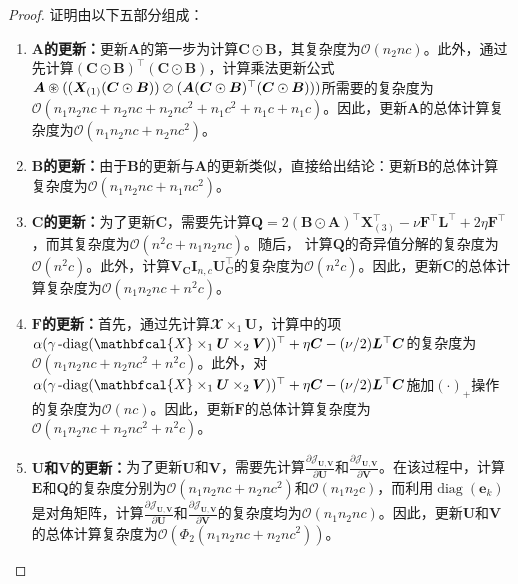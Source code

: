 \begin{proof}
证明由以下五部分组成：
\begin{enumerate}
    \item \textbf{$\boldsymbol{A}$的更新：}更新$\boldsymbol{A}$的第一步为计算$\boldsymbol{C}\odot\boldsymbol{B}$，其复杂度为$\mathcal{O}(n_{2}nc)$。此外，通过先计算$(\boldsymbol{C}\odot\boldsymbol{B})^{\top}(\boldsymbol{C}\odot\boldsymbol{B})$，计算乘法更新公式$\boldsymbol{A}\oast((\boldsymbol{X}_{(1)}(\boldsymbol{C}\odot\boldsymbol{B}))\oslash\allowbreak(\boldsymbol{A}(\boldsymbol{C}\odot\boldsymbol{B})^{\top}(\boldsymbol{C}\odot\boldsymbol{B})))$所需要的复杂度为$\mathcal{O}(n_{1}n_{2}nc+n_{2}nc+n_{2}nc^{2}+n_{1}c^{2}+n_{1}c+n_{1}c)$。因此，更新$\boldsymbol{A}$的总体计算复杂度为$\mathcal{O}(n_{1}n_{2}nc+n_{2}nc^{2})$。
    \item \textbf{$\boldsymbol{B}$的更新：}由于$\boldsymbol{B}$的更新与$\boldsymbol{A}$的更新类似，直接给出结论：更新$\boldsymbol{B}$的总体计算复杂度为$\mathcal{O}(n_{1}n_{2}nc+n_{1}nc^{2})$。
    \item \textbf{$\boldsymbol{C}$的更新：}为了更新$\boldsymbol{C}$，需要先计算$\boldsymbol{Q}=2(\boldsymbol{B}\odot\boldsymbol{A})^{\top}\boldsymbol{X}_{(3)}^{\top}-\nu\boldsymbol{F}^{\top}\boldsymbol{L}^{\top} + 2\eta\boldsymbol{F}^{\top}$，而其复杂度为$\mathcal{O}(n^{2}c+n_{1}n_{2}nc)$。随后，
    计算$\boldsymbol{Q}$的奇异值分解的复杂度为$\mathcal{O}(n^{2}c)$。此外，计算$\boldsymbol{V}_{\boldsymbol{C}}\boldsymbol{I}_{n,c}\boldsymbol{U}_{\boldsymbol{C}}^{\top}$的复杂度为$\mathcal{O}(n^{2}c)$。因此，更新$\boldsymbol{C}$的总体计算复杂度为$\mathcal{O}(n_{1}n_{2}nc+n^{2}c)$。
    \item \textbf{$\boldsymbol{F}$的更新：}首先，通过先计算$\mathbfcal{X}\times_{1}\boldsymbol{U}$，计算中的项$\alpha(\mydiag(\mathbfcal{X}\times_{1}\boldsymbol{U}\times_{2}\boldsymbol{V}))^{\top} +\eta\boldsymbol{C}-(\nu/2)\boldsymbol{L}^{\top}\boldsymbol{C}$的复杂度为$\mathcal{O}(n_{1}n_{2}nc+n_{2}nc^{2}+n^{2}c)$。此外，对$\alpha(\mydiag(\mathbfcal{X}\times_{1}\allowbreak\boldsymbol{U}\times_{2}\boldsymbol{V}))^{\top} +\eta\boldsymbol{C}-(\nu/2)\boldsymbol{L}^{\top}\boldsymbol{C}$施加$(\cdot)_{+}$操作的复杂度为$\mathcal{O}(nc)$。因此，更新$\boldsymbol{F}$的总体计算复杂度为$\mathcal{O}(n_{1}n_{2}nc+n_{2}nc^{2}+n^{2}c)$。
    \item \textbf{$\boldsymbol{U}$和$\boldsymbol{V}$的更新：}为了更新$\boldsymbol{U}$和$\boldsymbol{V}$，需要先计算$\frac{\partial\mathcal{J}_{\boldsymbol{U},\boldsymbol{V}}}{\partial\boldsymbol{U}}$和$\frac{\partial\mathcal{J}_{\boldsymbol{U},\boldsymbol{V}}}{\partial\boldsymbol{V}}$。在该过程中，计算$\boldsymbol{E}$和$\boldsymbol{Q}$的复杂度分别为$\mathcal{O}(n_{1}n_{2}nc+n_{2}nc^{2})$和$\mathcal{O}(n_{1}n_{2}c)$，而利用$\operatorname{diag}(\boldsymbol{e}_{k})$是对角矩阵，计算$\frac{\partial\mathcal{J}_{\boldsymbol{U},\boldsymbol{V}}}{\partial\boldsymbol{U}}$和$\frac{\partial\mathcal{J}_{\boldsymbol{U},\boldsymbol{V}}}{\partial\boldsymbol{V}}$的复杂度均为$\mathcal{O}(n_{1}n_{2}nc)$。因此，更新$\boldsymbol{U}$和$\boldsymbol{V}$的总体计算复杂度为$\mathcal{O}(\Phi_{2}(n_{1}n_{2}nc+n_{2}nc^{2}))$。
\end{enumerate}


\end{proof}
